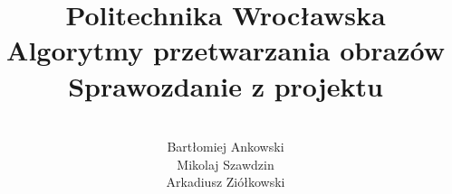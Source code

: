 \documentclass[a4paper,12pt]{article}
\title{\Huge \textbf{Politechnika Wrocławska\\[0.3in]} 
  \huge Algorytmy przetwarzania obrazów \\[0.2in]
  \LARGE Sprawozdanie z projektu
}
\date{}
\author{
 	\quad	\\
  Bartłomiej Ankowski\\
  Mikolaj Szawdzin\\
  Arkadiusz Ziółkowski\\
}
\begin{document}
\maketitle
\pagebreak

\tableofcontents
\pagebreak






\end{document}
